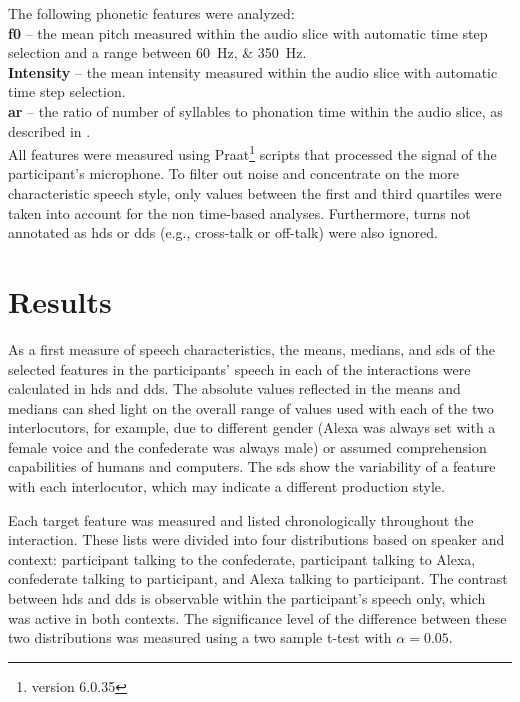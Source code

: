 The following phonetic features were analyzed:\\
\textbf{\Acf{f0}} -- the mean pitch measured within the audio slice with automatic time step selection and a range between \SIlist{60;350}{\hertz}.\\
\textbf{Intensity} -- the mean intensity measured within the audio slice with automatic time step selection.\\
\textbf{\Acf{ar}} -- the ratio of number of syllables to phonation time within the audio slice, as described in \citet{DeJong2009arcitulcationrate}.\\
All features were measured using Praat\footnote{version 6.0.35} \citep{Boersma2001praat} scripts that processed the signal of the participant's microphone.
To filter out noise and concentrate on the more characteristic speech style, only values between the first and third quartiles were taken into account for the non time-based analyses.
Furthermore, turns not annotated as \ac{hds} or \ac{dds} (e.g., cross-talk or off-talk) were also ignored.

\section{Results}
\label{sec:results}

As a first measure of speech characteristics, the means, medians, and \aclp{sd} of the selected features in the participants' speech in each of the interactions were calculated in \ac{hds} and \ac{dds}.
The absolute values reflected in the means and medians can shed light on the overall range of values used with each of the two interlocutors,
for example, due to different gender (Alexa was always set with a female voice and the confederate was always male) or assumed comprehension capabilities of humans and computers.
The \aclp{sd} show the variability of a feature with each interlocutor, which may indicate a different production style.

Each target feature was measured and listed chronologically throughout the interaction.
These lists were divided into four distributions based on speaker and context: participant talking to the confederate, participant talking to Alexa, confederate talking to participant, and Alexa talking to participant.
The contrast between \ac{hds} and \ac{dds} is observable within the participant's speech only, which was active in both contexts.
The significance level of the difference between these two distributions was measured using a two sample t-test with $\alpha=0.05$.

